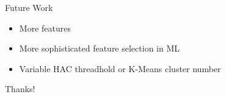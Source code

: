 \documentclass{beamer}
\begin{document}
\begin{frame}{Future Work}
    \begin{itemize}
    \item More features
    \item More sophisticated feature selection in ML
    \item Variable HAC threadhold or K-Means cluster number
    \end{itemize}
\end{frame}

\begin{frame}
\begin{center}\huge{Thanks!}\end{center}
\end{frame}
\end{document}
